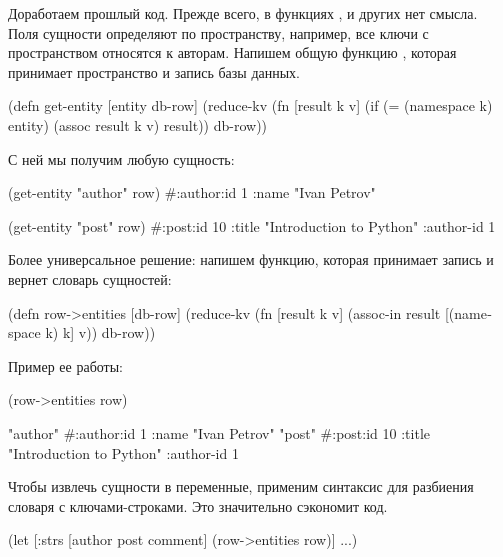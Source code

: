 Доработаем прошлый код. Прежде всего, в функциях ,  и других нет смысла. Поля сущности определяют по пространству, например, все ключи с пространством  относятся к авторам. Напишем общую функцию , которая принимает пространство и запись базы данных.

\begin{english}
  \begin{clojure}
(defn get-entity [entity db-row]
  (reduce-kv
   (fn [result k v]
     (if (= (namespace k) entity)
       (assoc result k v)
       result))
   {}
   db-row))
  \end{clojure}
\end{english}

С ней мы получим любую сущность:

\begin{english}
  \begin{clojure}
(get-entity "author" row)
#:author{:id 1 :name "Ivan Petrov"}

(get-entity "post" row)
#:post{:id 10 :title "Introduction to Python" :author-id 1}
  \end{clojure}
\end{english}

Более универсальное решение: напишем функцию, которая принимает запись и вернет словарь сущностей:

\begin{english}
  \begin{clojure}
(defn row->entities [db-row]
  (reduce-kv
   (fn [result k v]
     (assoc-in result [(namespace k) k] v))
   {}
   db-row))
  \end{clojure}
\end{english}

Пример ее работы:

\begin{english}
  \begin{clojure}
(row->entities row)

{"author" #:author{:id 1 :name "Ivan Petrov"}
 "post" #:post{:id 10 :title "Introduction to Python" :author-id 1}}
  \end{clojure}
\end{english}

Чтобы извлечь сущности в переменные, применим синтаксис  для разбиения словаря с ключами-строками. Это значительно сэкономит код.

\begin{english}
  \begin{clojure}
(let [{:strs [author
              post
              comment]} (row->entities row)]
  ...)
  \end{clojure}
\end{english}

